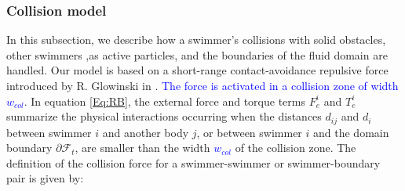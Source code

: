 \documentclass[graybox]{svmult}
\newcommand{\review}[1]{\textcolor{blue}{#1}}
\newcommand{\Fluid}{\mathcal{F}} %
\newcommand{\Alemap}{\mathcal{A}} %
\newcommand{\ALE}{ALE} %
\newcommand{\Vel}{u} %
\newcommand{\tvel}{U} %
\newcommand{\angvel}{\omega} %
\newcommand{\CenterMass}{x^{CM}} %
\newcommand{\Solid}{\mathcal{S}} %
\begin{document}




\subsubsection{Collision model} 
\label{rigidcollision}

In this subsection, we describe how a swimmer's collisions with solid obstacles, other swimmers ,as active particles, and the boundaries of the fluid domain are handled. Our model is based on a short-range contact-avoidance repulsive force introduced by R. Glowinski in \cite{glowinski}. \review{The force is activated in a collision zone of width $w_{col}$}.
In equation \eqref{Eq:RB}, the external force and torque terms $F_e^i$ and $T_e^i$ summarize the physical interactions occurring when the distances $d_{ij}$ and $d_{i}$ between swimmer $i$ and another body $j$, or between swimmer $i$ and the domain boundary $\partial \Fluid_t$, are smaller than the width \review{$w_{col}$} of the collision zone.  
The definition of the collision force for a swimmer-swimmer or swimmer-boundary pair is given by: 
\end{document}
